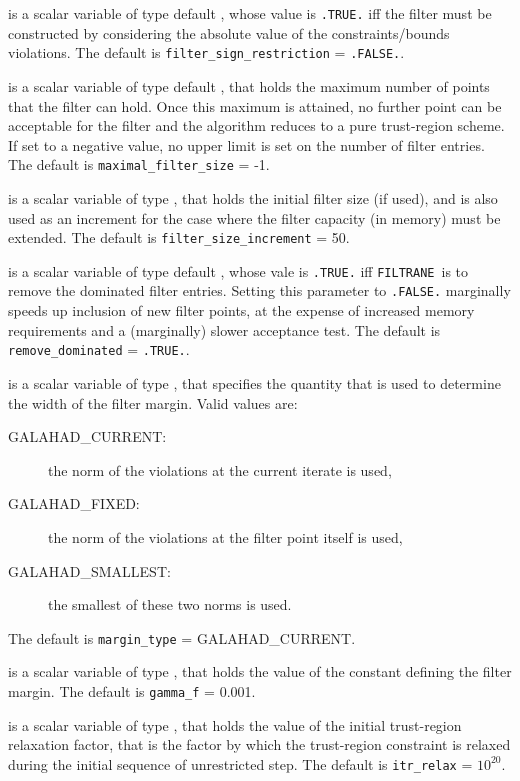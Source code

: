 \documentclass{galahad}
\newcommand{\packagename}{FILTRANE}
\newcommand{\sym}{\sf\small}
\newcommand{\filtrane}{{\tt \packagename}}
\begin{document}
\begin{description}
 is a scalar variable of type default \logical,
whose value is {\tt .TRUE.} iff the filter must be constructed by considering
the absolute value of the constraints/bounds violations.
The default is {\tt filter\_sign\_restriction} = {\tt .FALSE.}.

 is a scalar variable of type default \logical, that
holds the maximum number of points that the filter can hold. Once this maximum
is attained, no further point can be acceptable for the filter and the
algorithm reduces to a pure trust-region scheme.  If set to a negative value,
no upper limit is set on the number of filter entries.
The default is {\tt maximal\_filter\_size} = -1.

 is a scalar variable of type \integer,
that holds the initial filter size (if used), and is also used as an increment
for the case where the filter capacity (in memory) must be extended.
The default is {\tt filter\_size\_increment} = 50.

 is a scalar variable of type default \logical, whose
vale is {\tt .TRUE.} iff \filtrane\ is to remove the dominated filter entries.
Setting this parameter to {\tt .FALSE.} marginally speeds up inclusion of new
filter points, at the expense of increased memory requirements and a
(marginally) slower acceptance test. 
The default is {\tt remove\_dominated} = {\tt .TRUE.}.

 is a scalar variable of type \integer, that
specifies the quantity that is used to determine the width of the filter
margin. Valid values are:
\begin{description}
\item[\sym GALAHAD\_CURRENT:] the norm of the violations at the current
iterate is used,
\item[\sym GALAHAD\_FIXED:] the norm of the violations at the filter point
itself is used,
\item[\sym GALAHAD\_SMALLEST:] the smallest of these two norms is used.
\end{description}
The default is {\tt margin\_type} = {\sym GALAHAD\_CURRENT}.

 is a scalar variable of type \realdp, that holds the
value of the constant defining the filter margin.
The default is {\tt gamma\_f} = 0.001.

 is a scalar variable of type \realdp, that holds the
value of the initial trust-region relaxation factor, that is the factor by
which the trust-region constraint is relaxed during the initial sequence of
unrestricted step.
The default is {\tt itr\_relax} = $10^{20}$.


\end{description}
\end{document}
